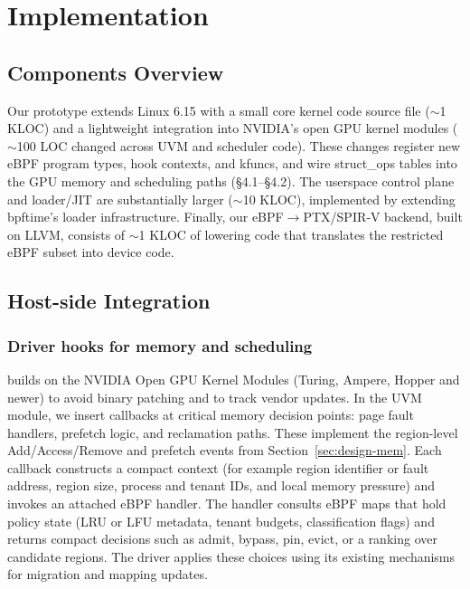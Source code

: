 \section{Implementation}
\label{sec:implementation}

\subsection{Components Overview}

Our prototype extends Linux 6.15 with a small core \sys kernel code source file ($\sim$1 KLOC) and a lightweight integration into NVIDIA's open GPU kernel modules ($\sim$100 LOC changed across UVM and scheduler code). These changes register new eBPF program types, hook contexts, and kfuncs, and wire struct\_ops tables into the GPU memory and scheduling paths (§4.1–§4.2). The userspace control plane and loader/JIT are substantially larger ($\sim$10 KLOC), implemented by extending bpftime's loader infrastructure. Finally, our eBPF$\rightarrow$PTX/SPIR‑V backend, built on LLVM, consists of $\sim$1 KLOC of lowering code that translates the restricted \sys eBPF subset into device code.

\subsection{Host-side Integration}
\label{sec:impl-host}

\subsubsection{Driver hooks for memory and scheduling}

\sys builds on the NVIDIA Open GPU Kernel Modules (Turing, Ampere, Hopper and
newer) to avoid binary patching and to track vendor updates. In the UVM module,
we insert callbacks at critical memory decision points: page fault handlers,
prefetch logic, and reclamation paths. These implement the region-level
Add/Access/Remove and prefetch events from Section~\ref{sec:design-mem}. Each
callback constructs a compact context (for example region identifier or fault
address, region size, process and tenant IDs, and local memory pressure) and
invokes an attached eBPF handler. The handler consults eBPF maps that hold
policy state (LRU or LFU metadata, tenant budgets, classification flags) and
returns compact decisions such as admit, bypass, pin, evict, or a ranking over
candidate regions. The driver applies these choices using its existing mechanisms
for migration and mapping updates.

